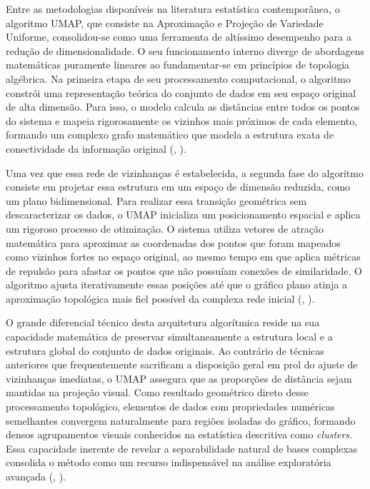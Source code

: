 \documentclass[
    12pt
    ,oneside
    ,a4paper
    ,chapter=TITLE
    ,section=TITLE
    ,sumario=abnt-6027-2012
    ,english,brazil]{abntex2} %
\begin{document}
Entre as metodologias disponíveis na literatura estatística contemporânea, o algoritmo UMAP, que consiste na Aproximação e Projeção de Variedade Uniforme, consolidou-se como uma ferramenta de altíssimo desempenho para a redução de dimensionalidade. O seu funcionamento interno diverge de abordagens matemáticas puramente lineares ao fundamentar-se em princípios de topologia algébrica. Na primeira etapa de seu processamento computacional, o algoritmo constrói uma representação teórica do conjunto de dados em seu espaço original de alta dimensão. Para isso, o modelo calcula as distâncias entre todos os pontos do sistema e mapeia rigorosamente os vizinhos mais próximos de cada elemento, formando um complexo grafo matemático que modela a estrutura exata de conectividade da informação original (, \citeyear{McInnes2018}).

Uma vez que essa rede de vizinhanças é estabelecida, a segunda fase do algoritmo consiste em projetar essa estrutura em um espaço de dimensão reduzida, como um plano bidimensional. Para realizar essa transição geométrica sem descaracterizar os dados, o UMAP inicializa um posicionamento espacial e aplica um rigoroso processo de otimização. O sistema utiliza vetores de atração matemática para aproximar as coordenadas dos pontos que foram mapeados como vizinhos fortes no espaço original, ao mesmo tempo em que aplica métricas de repulsão para afastar os pontos que não possuíam conexões de similaridade. O algoritmo ajusta iterativamente essas posições até que o gráfico plano atinja a aproximação topológica mais fiel possível da complexa rede inicial (, \citeyear{Bollon2022}).

O grande diferencial técnico desta arquitetura algorítmica reside na sua capacidade matemática de preservar simultaneamente a estrutura local e a estrutura global do conjunto de dados originais. Ao contrário de técnicas anteriores que frequentemente sacrificam a disposição geral em prol do ajuste de vizinhanças imediatas, o UMAP assegura que as proporções de distância sejam mantidas na projeção visual. Como resultado geométrico direto desse processamento topológico, elementos de dados com propriedades numéricas semelhantes convergem naturalmente para regiões isoladas do gráfico, formando densos agrupamentos visuais conhecidos na estatística descritiva como \textit{clusters}. Essa capacidade inerente de revelar a separabilidade natural de bases complexas consolida o método como um recurso indispensável na análise exploratória avançada (, \citeyear{Bollon2022}).
\end{document}
